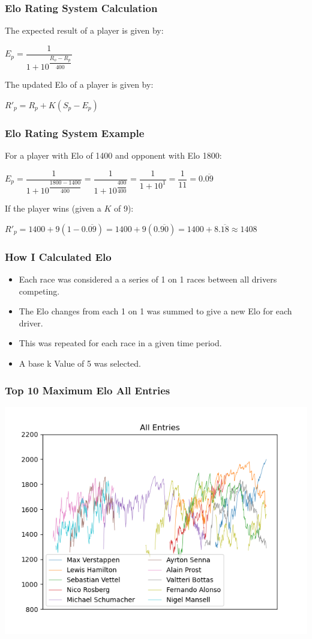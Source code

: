 \documentclass{beamer}
\begin{document}
\begin{frame}
    \frametitle{Elo Rating System Calculation}
    The expected result of a player is given by:
    \begin{center}
        $E_p = \dfrac{1}{1+10^ \dfrac{R_o-R_p}{400}}$
    \end{center}
    The updated Elo of a player is given by:
    \begin{center}
        $R'_p = R_p + K(S_p-E_p)$
    \end{center}
\end{frame}

\begin{frame}
    \frametitle{Elo Rating System Example}
    For a player with Elo of 1400 and opponent with Elo 1800:
    \begin{center}
        $E_p = \dfrac{1}{1+10^ \dfrac{1800-1400}{400}} = \dfrac{1}{1+10^ \dfrac{400}{400}}= \dfrac{1}{1+10^1}= \dfrac{1}{11}= 0.\overline{09}$
    \end{center}
    If the player wins (given a $K$ of 9):
    \begin{center}
        $R'_p = 1400 + 9(1-0.\overline{09})= 1400 + 9(0.\overline{90})= 1400 + 8.\overline{18} \approx 1408$
    \end{center}
\end{frame}

\begin{frame}
    \frametitle{How I Calculated Elo}
    \begin{itemize}
        \item Each race was considered a a series of 1 on 1 races between all drivers competing.
        \item The Elo changes from each 1 on 1 was summed to give a new Elo for each driver.
        \item This was repeated for each race in a given time period.
        \item A base k Value of 5 was selected.
    \end{itemize}
\end{frame}

\begin{frame}
    \frametitle{Top 10 Maximum Elo All Entries}
    \includegraphics[width=\textwidth]{AllTimeTop10EloAll.png}
\end{frame}
\end{document}
